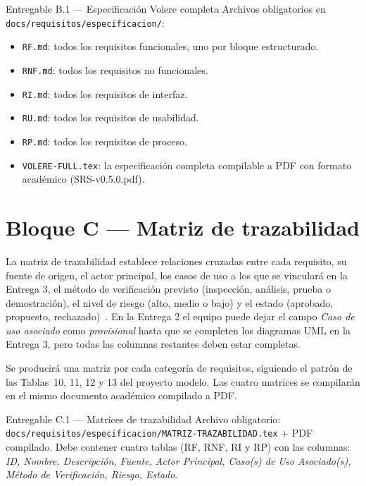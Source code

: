 \documentclass[11pt,a4paper]{article}
\begin{document}
\begin{cajaentregable}{Entregable B.1 --- Especificaci\'on Volere completa}
Archivos obligatorios en \texttt{docs/requisitos/especificacion/}:
\begin{itemize}
    \item \texttt{RF.md}: todos los requisitos funcionales, uno por bloque estructurado.
    \item \texttt{RNF.md}: todos los requisitos no funcionales.
    \item \texttt{RI.md}: todos los requisitos de interfaz.
    \item \texttt{RU.md}: todos los requisitos de usabilidad.
    \item \texttt{RP.md}: todos los requisitos de proceso.
    \item \texttt{VOLERE-FULL.tex}: la especificaci\'on completa compilable a PDF con formato acad\'emico (SRS-v0.5.0.pdf).
\end{itemize}
\end{cajaentregable}

\section{Bloque C --- Matriz de trazabilidad}

La matriz de trazabilidad establece relaciones cruzadas entre cada requisito, su fuente de origen, el actor principal, los casos de uso a los que se vincular\'a en la Entrega 3, el m\'etodo de verificaci\'on previsto (inspecci\'on, an\'alisis, prueba o demostraci\'on), el nivel de riesgo (alto, medio o bajo) y el estado (aprobado, propuesto, rechazado)~\cite{iso29148,dick2017requirements}. En la Entrega 2 el equipo puede dejar el campo \emph{Caso de uso asociado} como \emph{provisional} hasta que se completen los diagramas UML en la Entrega 3, pero todas las columnas restantes deben estar completas.

Se producir\'a una matriz por cada categor\'ia de requisitos, siguiendo el patr\'on de las Tablas~10, 11, 12 y 13 del proyecto modelo. Las cuatro matrices se compilar\'an en el mismo documento acad\'emico compilado a PDF.

\begin{cajaentregable}{Entregable C.1 --- Matrices de trazabilidad}
Archivo obligatorio: \texttt{docs/requisitos/especificacion/MATRIZ-TRAZABILIDAD.tex} + PDF compilado. Debe contener cuatro tablas (RF, RNF, RI y RP) con las columnas: \emph{ID, Nombre, Descripci\'on, Fuente, Actor Principal, Caso(s) de Uso Asociado(s), M\'etodo de Verificaci\'on, Riesgo, Estado}.
\end{cajaentregable}
\end{document}
